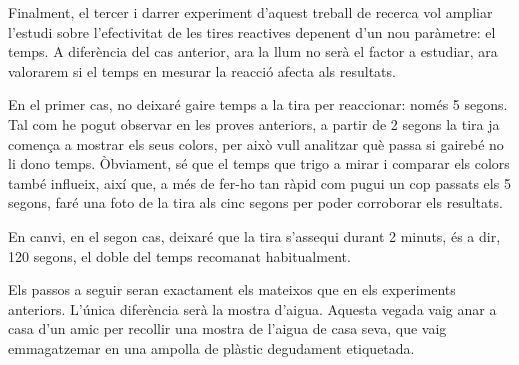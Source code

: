 Finalment, el tercer i darrer experiment d’aquest treball de recerca vol ampliar l'estudi sobre l'efectivitat de les tires reactives depenent d'un nou paràmetre: el temps. A diferència del cas anterior, ara la llum no serà el factor a estudiar, ara valorarem si el temps en mesurar la reacció afecta als resultats.

En el primer cas, no deixaré gaire temps a la tira per reaccionar: només 5 segons. Tal com he pogut observar en les proves anteriors, a partir de 2 segons la tira ja comença a mostrar els seus colors, per això vull analitzar què passa si gairebé no li dono temps. Òbviament, sé que el temps que trigo a mirar i comparar els colors també influeix, així que, a més de fer-ho tan ràpid com pugui un cop passats els 5 segons, faré una foto de la tira als cinc segons per poder corroborar els resultats.

En canvi, en el segon cas, deixaré que la tira s’assequi durant 2 minuts, és a dir, 120 segons, el doble del temps recomanat habitualment.

Els passos a seguir seran exactament els mateixos que en els experiments anteriors. L’única diferència serà la mostra d’aigua. Aquesta vegada vaig anar a casa d’un amic per recollir una mostra de l’aigua de casa seva, que vaig emmagatzemar en una ampolla de plàstic degudament etiquetada.

